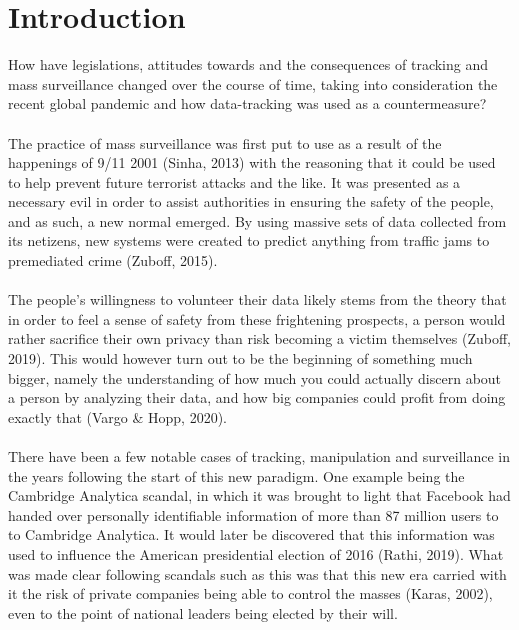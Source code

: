 \documentclass[11pt]{article}
\begin{document}
\section{Introduction}
How have legislations, attitudes towards and the consequences of tracking and mass surveillance changed over the course of time, taking into consideration the recent global pandemic and how data-tracking was used as a countermeasure? 
\\ \\
The practice of mass surveillance was first put to use as a result of the happenings of 9/11 2001 (Sinha, 2013) with the reasoning that it could be used to help prevent future terrorist attacks and the like. It was presented as a necessary evil in order to assist authorities in ensuring the safety of the people, and as such, a new normal emerged. By using massive sets of data collected from its netizens, new systems were created to predict anything from traffic jams to premediated crime (Zuboff, 2015).
\\ \\
The people’s willingness to volunteer their data likely stems from the theory that in order to feel a sense of safety from these frightening prospects, a person would rather sacrifice their own privacy than risk becoming a victim themselves (Zuboff, 2019). This would however turn out to be the beginning of something much bigger, namely the understanding of how much you could actually discern about a person by analyzing their data, and how big companies could profit from doing exactly that (Vargo \& Hopp, 2020).
\\ \\
There have been a few notable cases of tracking, manipulation and surveillance in the years following the start of this new paradigm. One example being the Cambridge Analytica scandal, in which it was brought to light that Facebook had handed over personally identifiable information of more than 87 million users to to Cambridge Analytica. It would later be discovered that this information was used to influence the American presidential election of 2016 (Rathi, 2019). What was made clear following scandals such as this was that this new era carried with it the risk of private companies being able to control the masses (Karas, 2002), even to the point of national leaders being elected by their will. 
\\ \\
\end{document}
